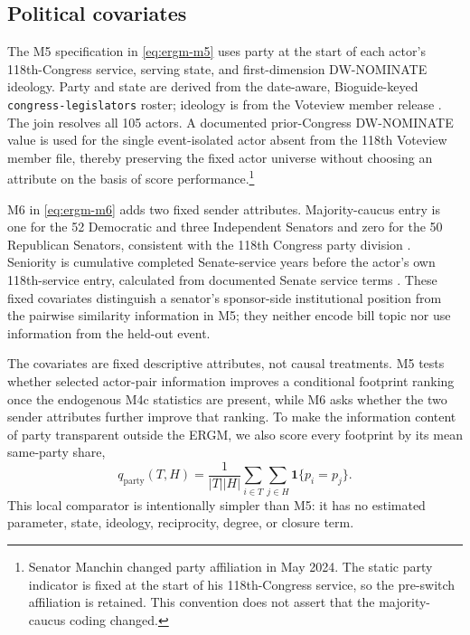 \documentclass{nws}
\begin{document}
\subsection{Political covariates}\label{sec:political-covariates}

The M5 specification in \eqref{eq:ergm-m5} uses party at the start of each actor's 118th-Congress service, serving state, and first-dimension DW-NOMINATE ideology. Party and state are derived from the date-aware, Bioguide-keyed \texttt{congress-legislators} roster; ideology is from the Voteview member release \citep{congressLegislators2026,voteviewMembers2026,bocheEtAl2018}. The join resolves all 105 actors. A documented prior-Congress DW-NOMINATE value is used for the single event-isolated actor absent from the 118th Voteview member file, thereby preserving the fixed actor universe without choosing an attribute on the basis of score performance.\footnote{Senator Manchin changed party affiliation in May 2024. The static party indicator is fixed at the start of his 118th-Congress service, so the pre-switch affiliation is retained. This convention does not assert that the majority-caucus coding changed.}

M6 in \eqref{eq:ergm-m6} adds two fixed sender attributes. Majority-caucus entry is one for the 52 Democratic and three Independent Senators and zero for the 50 Republican Senators, consistent with the 118th Congress party division \citep{senatePartyDivision2026}. Seniority is cumulative completed Senate-service years before the actor's own 118th-service entry, calculated from documented Senate service terms \citep{congressLegislators2026,senateHistoricalSenators2026}. These fixed covariates distinguish a senator's sponsor-side institutional position from the pairwise similarity information in M5; they neither encode bill topic nor use information from the held-out event.

The covariates are fixed descriptive attributes, not causal treatments. M5 tests whether selected actor-pair information improves a conditional footprint ranking once the endogenous M4c statistics are present, while M6 asks whether the two sender attributes further improve that ranking. To make the information content of party transparent outside the ERGM, we also score every footprint by its mean same-party share,
\begin{equation}
 q_{\mathrm{party}}(T,H)=\frac{1}{|T||H|}\sum_{i\in T}\sum_{j\in H}\mathbf{1}\{p_i=p_j\}.
 \label{eq:party-baseline}
\end{equation}
This local comparator is intentionally simpler than M5: it has no estimated parameter, state, ideology, reciprocity, degree, or closure term.
\end{document}
